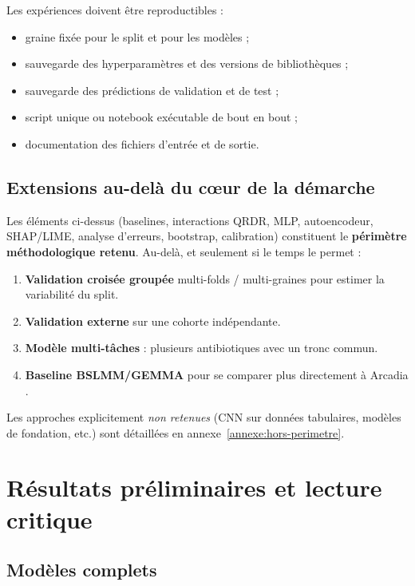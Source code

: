 \documentclass[11pt,a4paper]{article}
\begin{document}
Les expériences doivent être reproductibles :
\begin{itemize}[leftmargin=1.2em]
    \item graine fixée pour le split et pour les modèles ;
    \item sauvegarde des hyperparamètres et des versions de bibliothèques ;
    \item sauvegarde des prédictions de validation et de test ;
    \item script unique ou notebook exécutable de bout en bout ;
    \item documentation des fichiers d'entrée et de sortie.
\end{itemize}

\subsection{Extensions au-delà du cœur de la démarche}

Les éléments ci-dessus (baselines, interactions QRDR, MLP, autoencodeur, SHAP/LIME, analyse d'erreurs, bootstrap, calibration) constituent le \textbf{périmètre méthodologique retenu}. Au-delà, et seulement si le temps le permet :
\begin{enumerate}[leftmargin=1.4em]
    \item \textbf{Validation croisée groupée} multi-folds / multi-graines pour estimer la variabilité du split.
    \item \textbf{Validation externe} sur une cohorte indépendante.
    \item \textbf{Modèle multi-tâches} : plusieurs antibiotiques avec un tronc commun.
    \item \textbf{Baseline BSLMM/GEMMA} pour se comparer plus directement à Arcadia \citep{patton2025,zhou2013}.
\end{enumerate}

Les approches explicitement \emph{non retenues} (CNN sur données tabulaires, modèles de fondation, etc.) sont détaillées en annexe~\ref{annexe:hors-perimetre}.

\section{Résultats préliminaires et lecture critique}

\subsection{Modèles complets}
\end{document}
